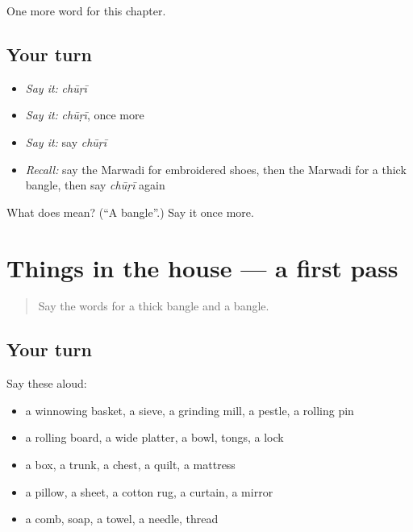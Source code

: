 \begin{grammarlens}[title={What you've built}]
One more word for this chapter.
\end{grammarlens}

\subsection*{Your turn}
\begin{itemize}
\raggedright
  \item \emph{Say it:} \emph{chūṛī}
  \item \emph{Say it:} \emph{chūṛī}, once more
  \item \emph{Say it:} say \emph{chūṛī}
  \item \emph{Recall:} say the Marwadi for embroidered shoes, then the Marwadi for a thick bangle, then say \emph{chūṛī} again
\end{itemize}

\begin{tcolorbox}[breakable,colback=teal!4,colframe=teal!35!black,title={Before you move on}]
What does  mean? (\textquotedblleft{}A bangle\textquotedblright{}.) Say it once more.
\end{tcolorbox}
\section[(dialogue)]{Things in the house — a first pass}

\label{lesson:MW-R129-first-pass-things-in-the-house}



\begin{quote}
Say the words for a thick bangle and a bangle.
\end{quote}

\subsection*{Your turn}
Say these aloud:

\begin{itemize}
\raggedright
  \item a winnowing basket, a sieve, a grinding mill, a pestle, a rolling pin
  \item a rolling board, a wide platter, a bowl, tongs, a lock
  \item a box, a trunk, a chest, a quilt, a mattress
  \item a pillow, a sheet, a cotton rug, a curtain, a mirror
  \item a comb, soap, a towel, a needle, thread
\end{itemize}

